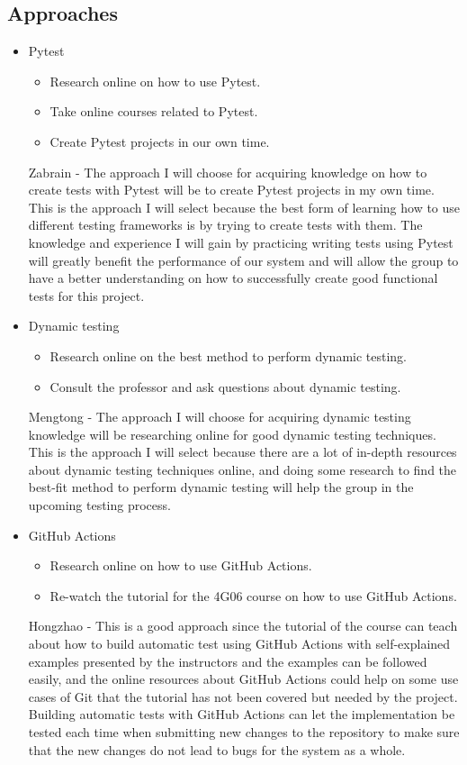 \documentclass[12pt, titlepage]{article}
\begin{document}
\subsection*{Approaches}
\begin{itemize}
    \item Pytest
    \begin{itemize}
        \item Research online on how to use Pytest.
        \item Take online courses related to Pytest.
        \item Create Pytest projects in our own time.
    \end{itemize}
    Zabrain - The approach I will choose for acquiring knowledge on how to create tests with Pytest will be to create Pytest projects in my own time. This is the approach I will select because the best form of learning how to use different testing frameworks is by trying to create tests with them. The knowledge and experience I will gain by practicing writing tests using Pytest will greatly benefit the performance of our system and will allow the group to have a better understanding on how to successfully create good functional tests for this project.
    \item Dynamic testing
    \begin{itemize}
        \item Research online on the best method to perform dynamic testing.
        \item Consult the professor and ask questions about dynamic testing.
    \end{itemize}
    Mengtong - The approach I will choose for acquiring dynamic testing knowledge will be researching online for good dynamic testing techniques. This is the approach I will select because there are a lot of in-depth resources about dynamic testing techniques online, and doing some research to find the best-fit method to perform dynamic testing will help the group in the upcoming testing process.
    \item GitHub Actions
    \begin{itemize}
        \item Research online on how to use GitHub Actions.
        \item Re-watch the tutorial for the 4G06 course on how to use GitHub Actions.
    \end{itemize}
    Hongzhao - This is a good approach since the tutorial of the course can teach about how to build automatic test using GitHub Actions with self-explained examples presented by the instructors and the examples can be followed easily, and the online resources about GitHub Actions could help on some use cases of Git that the tutorial has not been covered but needed by the project. Building automatic tests with GitHub Actions can let the implementation be tested each time when submitting new changes to the repository to make sure that the new changes do not lead to bugs for the system as a whole.

\end{itemize}
\end{document}
